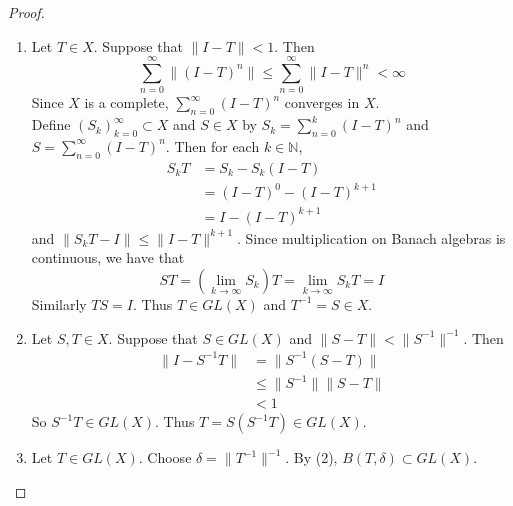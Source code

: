 \documentclass[12pt]{amsart}
\theoremstyle{definition}
\newcommand{\del}{\delta}
\newcommand{\N}{\mathbb{N}}
\DeclareMathOperator*{\0}{\mbf{0}}
\DeclareMathOperator*{\1}{\mbf{1}}
\begin{document}
	\begin{proof}\
		\begin{enumerate}
			\item Let $T \in X$. Suppose that $\|I-T \|< 1$. Then $$\sum_{n=0}^{\infty} \|(I -T)^n \| \leq \sum_{n=0}^{\infty} \|I -T \|^{n} < \infty$$ Since $X$ is a complete, $\sum\limits_{n=0}^{\infty}(I-T)^n$ converges in $X$.\\
			Define $(S_k)_{k=0}^{\infty} \subset X$ and $S \in X$ by $S_k = \sum\limits_{n=0}^{k} (I-T)^n$ and \\ $S = \sum\limits_{n=0}^{\infty}(I-T)^n$. Then for each $k \in \N$,
			\begin{align*}
				S_k T
				&= S_k - S_k(I-T) \\
				&= (I-T)^0 - (I-T)^{k+1} \\
				&= I - (I-T)^{k+1}
			\end{align*}
			and $\|S_kT - I \|\leq \|I-T \|^{k+1}$. Since multiplication on Banach algebras is continuous, we have that $$ST = (\lim_{k \rightarrow \infty} S_k)T = \lim\limits_{k \rightarrow \infty}S_kT = I$$
			Similarly $TS = I$. Thus $T \in GL(X)$ and $T^{-1} = S \in X$. \vspace{.5cm}\\
			\item  Let $S, T \in X$. Suppose that $S \in GL(X)$ and $\|S-T \|< \|S^{-1} \|^{-1}$. Then 
			\begin{align*}
				\|I - S^{-1}T \|
				& = \|S^{-1}(S - T) \|\\
				& \leq \|S^{-1} \|\|S -T \|\\
				&< 1
			\end{align*}
			So $S^{-1}T \in GL(X)$. Thus $T = S (S^{-1}T) \in GL(X)$. \vspace{.5cm}\\
			\item Let $T \in GL(X)$. Choose $\del = \|T^{-1}\|^{-1}$. By (2), $B(T, \del) \subset GL(X)$.
		\end{enumerate}
	\end{proof}	
	
	
	
	
	











	
	
	
	
	
	
\end{document}
